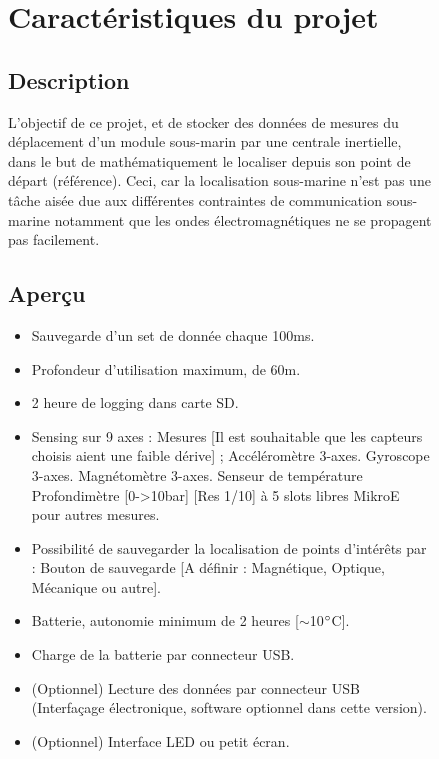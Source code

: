 \begin{figure}

\hfill


\begin{minipage}{1\textwidth}
\section{Caractéristiques du projet}

\subsection{Description}
L’objectif de ce projet, et de stocker des données de mesures du déplacement d’un module sous-marin par une centrale inertielle, dans le but de mathématiquement le localiser depuis son point de départ (référence). Ceci, car la localisation sous-marine n’est pas une tâche aisée due aux différentes contraintes de communication sous-marine notamment que les ondes électromagnétiques ne se propagent pas facilement.
\end{minipage}

\begin{minipage}{1\textwidth}


\subsection{Aperçu}
    \begin{itemize}
        \item	Sauvegarde d’un set de donnée chaque 100ms.
        \item	Profondeur d’utilisation maximum, de 60m.
        \item	2 heure de logging dans carte SD.
        \item	Sensing sur 9 axes :
        \subitem Mesures [Il est souhaitable que les capteurs choisis aient une faible dérive] ;
        \subsubitem Accéléromètre 3-axes. 
        \subsubitem	Gyroscope 3-axes.
        \subsubitem	Magnétomètre 3-axes. 
        \subsubitem	Senseur de température
        \subsubitem	Profondimètre [0->10bar] [Res 1/10]
         à 5 slots libres MikroE pour autres mesures. 
        \item Possibilité de sauvegarder la localisation de points d’intérêts par :
        \subitem Bouton de sauvegarde [A définir : Magnétique, Optique, Mécanique ou autre].
        \item Batterie, autonomie minimum de 2 heures [$\sim$10$\degree$C].
        \item Charge de la batterie par connecteur USB.
        \item (Optionnel) Lecture des données par connecteur USB (Interfaçage électronique, software optionnel dans cette version).
        \item (Optionnel) Interface LED ou petit écran.\\
    \end{itemize}


\end{minipage}

\end{figure}


